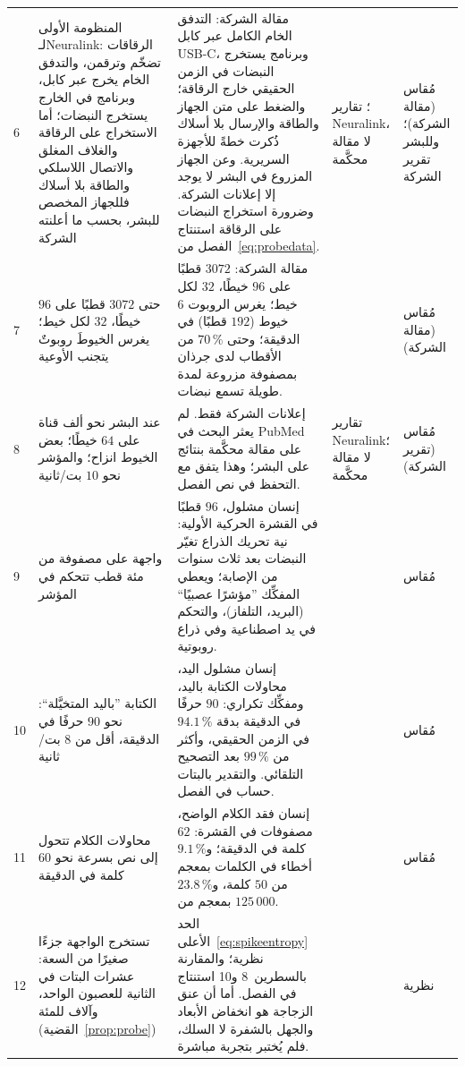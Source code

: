 {\begin{longtable}{>{\raggedright}p{0.5cm}>{\raggedright}p{4.0cm}>{\raggedright}p{5.6cm}>{\raggedright}p{2.3cm}>{\raggedright\arraybackslash}p{1.7cm}}
6 & المنظومة الأولى لـ\foreignlanguage{english}{Neuralink}: الرقاقات تضخّم وترقمن، والتدفق الخام يخرج عبر كابل، وبرنامج في الخارج يستخرج النبضات؛ أما الاستخراج على الرقاقة والغلاف المغلق والاتصال اللاسلكي والطاقة بلا أسلاك فللجهاز المخصص للبشر، بحسب ما أعلنته الشركة & مقالة الشركة: التدفق الخام الكامل عبر كابل \foreignlanguage{english}{USB-C}، وبرنامج يستخرج النبضات في الزمن الحقيقي خارج الرقاقة؛ والضغط على متن الجهاز والطاقة والإرسال بلا أسلاك ذُكرت خطةً للأجهزة السريرية. وعن الجهاز المزروع في البشر لا يوجد إلا إعلانات الشركة. وضرورة استخراج النبضات على الرقاقة استنتاج الفصل من~\eqref{eq:probedata}. & \cite{Musk2019}؛ تقارير \foreignlanguage{english}{Neuralink}، لا مقالة محكَّمة & مُقاس (مقالة الشركة)؛ وللبشر تقرير الشركة \\
7 & حتى $3072$ قطبًا على $96$ خيطًا، $32$ لكل خيط؛ يغرس الخيوطَ روبوتٌ يتجنب الأوعية & مقالة الشركة: $3072$ قطبًا على $96$ خيطًا، $32$ لكل خيط؛ يغرس الروبوت $6$ خيوط ($192$ قطبًا) في الدقيقة؛ وحتى $70\,\%$ من الأقطاب لدى جرذان بمصفوفة مزروعة لمدة طويلة تسمع نبضات. & \cite{Musk2019} & مُقاس (مقالة الشركة) \\
8 & عند البشر نحو ألف قناة على $64$ خيطًا؛ بعض الخيوط انزاح؛ والمؤشر نحو $10$ بت/ثانية & إعلانات الشركة فقط. لم يعثر البحث في \foreignlanguage{english}{PubMed} على مقالة محكَّمة بنتائج على البشر؛ وهذا يتفق مع التحفظ في نص الفصل. & تقارير \foreignlanguage{english}{Neuralink}؛ لا مقالة محكَّمة & مُقاس (تقرير الشركة) \\
9 & واجهة على مصفوفة من مئة قطب تتحكم في المؤشر & إنسان مشلول، $96$ قطبًا في القشرة الحركية الأولية: نية تحريك الذراع تغيّر النبضات بعد ثلاث سنوات من الإصابة؛ ويعطي المفكِّك ”مؤشرًا عصبيًا“ (البريد، التلفاز)، والتحكم في يد اصطناعية وفي ذراع روبوتية. & \cite{Hochberg2006} & مُقاس \\
10 & الكتابة ”باليد المتخيَّلة“: نحو $90$ حرفًا في الدقيقة، أقل من $8$ بت/ثانية & إنسان مشلول اليد، محاولات الكتابة باليد، ومفكِّك تكراري: $90$ حرفًا في الدقيقة بدقة $94.1\,\%$ في الزمن الحقيقي، وأكثر من $99\,\%$ بعد التصحيح التلقائي. والتقدير بالبتات حساب في الفصل. & \cite{Willett2021} & مُقاس \\
11 & محاولات الكلام تتحول إلى نص بسرعة نحو $60$ كلمة في الدقيقة & إنسان فقد الكلام الواضح، مصفوفات في القشرة: $62$ كلمة في الدقيقة؛ و$9.1\,\%$ أخطاء في الكلمات بمعجم من $50$ كلمة، و$23.8\,\%$ بمعجم من $125\,000$. & \cite{Willett2023} & مُقاس \\
12 & تستخرج الواجهة جزءًا صغيرًا من السعة: عشرات البتات في الثانية للعصبون الواحد، وآلاف للمئة (القضية~\ref{prop:probe}) & الحد الأعلى~\eqref{eq:spikeentropy} نظرية؛ والمقارنة بالسطرين~8 و10 استنتاج في الفصل. أما أن عنق الزجاجة هو انخفاض الأبعاد والجهل بالشفرة لا السلك، فلم يُختبر بتجربة مباشرة. & \cite{Rieke1997} & نظرية \\

\end{longtable}}
